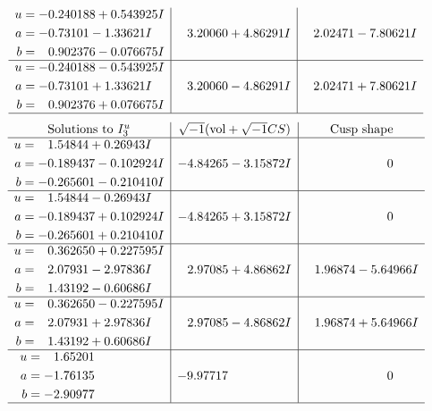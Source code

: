 \documentclass[1p]{elsarticle_modified}
\theoremstyle{definition}
\newcommand{\I}{\sqrt{-1}}
\begin{document}
$$\begin{array}{c|c|c}
\begin{aligned}
u &= -0.240188 + 0.543925 I \\
a &= -0.73101 - 1.33621 I \\
b &= \phantom{-}0.902376 - 0.076675 I\end{aligned}
 & \phantom{-}3.20060 + 4.86291 I & \phantom{-}2.02471 - 7.80621 I \\ \hline\begin{aligned}
u &= -0.240188 - 0.543925 I \\
a &= -0.73101 + 1.33621 I \\
b &= \phantom{-}0.902376 + 0.076675 I\end{aligned}
 & \phantom{-}3.20060 - 4.86291 I & \phantom{-}2.02471 + 7.80621 I\\
 \hline 
 \end{array}$$\newpage$$\begin{array}{c|c|c}  
\text{Solutions to }I^u_{3}& \I (\text{vol} + \sqrt{-1}CS) & \text{Cusp shape}\\
 \hline 
\begin{aligned}
u &= \phantom{-}1.54844 + 0.26943 I \\
a &= -0.189437 - 0.102924 I \\
b &= -0.265601 - 0.210410 I\end{aligned}
 & -4.84265 - 3.15872 I & \phantom{-0.000000 } 0 \\ \hline\begin{aligned}
u &= \phantom{-}1.54844 - 0.26943 I \\
a &= -0.189437 + 0.102924 I \\
b &= -0.265601 + 0.210410 I\end{aligned}
 & -4.84265 + 3.15872 I & \phantom{-0.000000 } 0 \\ \hline\begin{aligned}
u &= \phantom{-}0.362650 + 0.227595 I \\
a &= \phantom{-}2.07931 - 2.97836 I \\
b &= \phantom{-}1.43192 - 0.60686 I\end{aligned}
 & \phantom{-}2.97085 + 4.86862 I & \phantom{-}1.96874 - 5.64966 I \\ \hline\begin{aligned}
u &= \phantom{-}0.362650 - 0.227595 I \\
a &= \phantom{-}2.07931 + 2.97836 I \\
b &= \phantom{-}1.43192 + 0.60686 I\end{aligned}
 & \phantom{-}2.97085 - 4.86862 I & \phantom{-}1.96874 + 5.64966 I \\ \hline\begin{aligned}
u &= \phantom{-}1.65201\phantom{ +0.000000I} \\
a &= -1.76135\phantom{ +0.000000I} \\
b &= -2.90977\phantom{ +0.000000I}\end{aligned}
 & -9.97717\phantom{ +0.000000I} & \phantom{-0.000000 } 0\\
 \hline 
 \end{array}$$\newpage\newpage\renewcommand{\arraystretch}{1}
\end{document}
